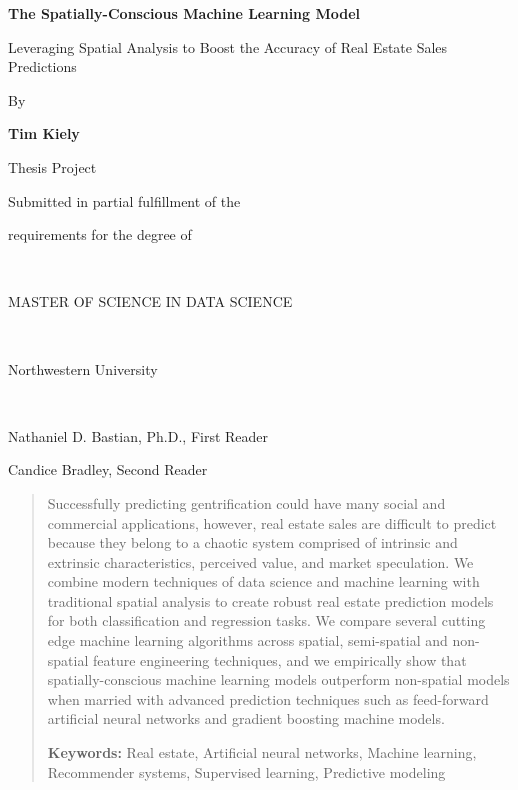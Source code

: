 \documentclass[12pt,]{article}
\title{}
\author{}
\date{}
\begin{document}

\titlepage
\center
\vspace{4 cm}
\LARGE

\bf 
The Spatially-Conscious Machine Learning Model  

\Large

Leveraging Spatial Analysis to Boost the Accuracy of Real Estate Sales
Predictions

\rm
\normalsize

By

\textbf{Tim Kiely}

Thesis Project

Submitted in partial fulfillment of the

requirements for the degree of

~

MASTER OF SCIENCE IN DATA SCIENCE

~

Northwestern University

~

Nathaniel D. Bastian, Ph.D., First Reader

Candice Bradley, Second Reader

\newpage
\normalsize
\singlespace
\begin{abstract}

Successfully predicting gentrification could have many social and commercial applications, however, real estate sales are difficult to predict because they belong to a chaotic system comprised of intrinsic and extrinsic characteristics, perceived value, and market speculation. We combine modern techniques of data science and machine learning with traditional spatial analysis to create robust real estate prediction models for both classification and regression tasks. We compare several cutting edge machine learning algorithms across spatial, semi-spatial and non-spatial feature engineering techniques, and we empirically show that spatially-conscious machine learning models outperform non-spatial models when married with advanced prediction techniques such as feed-forward artificial neural networks and gradient boosting machine models. 

\textbf{Keywords:} Real estate, Artificial neural networks, Machine learning, Recommender systems, Supervised learning, Predictive modeling

\end{abstract}

\newpage
\normalsize
\singlespace
\tableofcontents
\doublespace
\newpage
{}
\end{document}

